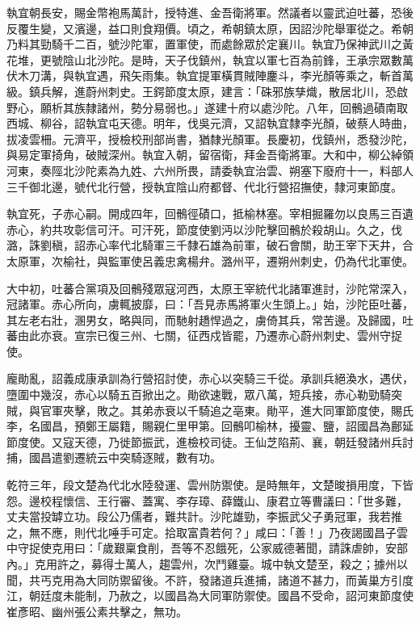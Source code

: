 \begin{pinyinscope}
 執宜朝長安，賜金幣袍馬萬計，授特進、金吾衛將軍。然議者以靈武迫吐蕃，恐後反覆生變，又濱邊，益口則食翔價。頃之，希朝鎮太原，因詔沙陀舉軍從之。希朝乃料其勁騎千二百，號沙陀軍，置軍使，而處餘眾於定襄川。執宜乃保神武川之黃花堆，更號陰山北沙陀。是時，天子伐鎮州，執宜以軍七百為前鋒，王承宗眾數萬伏木刀溝，與執宜遇，飛矢雨集。執宜提軍橫貫賊陣鏖斗，李光顏等乘之，斬首萬級。鎮兵解，進蔚州刺史。王鍔節度太原，建言：「硃邪族孳熾，散居北川，恐啟野心，願析其族隸諸州，勢分易弱也。」遂建十府以處沙陀。八年，回鶻過磧南取西城、柳谷，詔執宜屯天德。明年，伐吳元濟，又詔執宜隸李光顏，破蔡人時曲，拔凌雲柵。元濟平，授檢校刑部尚書，猶隸光顏軍。長慶初，伐鎮州，悉發沙陀，與易定軍掎角，破賊深州。執宜入朝，留宿衛，拜金吾衛將軍。大和中，柳公綽領河東，奏陘北沙陀素為九姓、六州所畏，請委執宜治雲、朔塞下廢府十一，料部人三千御北邊，號代北行營，授執宜陰山府都督、代北行營招撫使，隸河東節度。



 執宜死，子赤心嗣。開成四年，回鶻徑磧口，抵榆林塞。宰相掘羅勿以良馬三百遺赤心，約共攻彰信可汗。可汗死，節度使劉沔以沙陀擊回鶻於殺胡山。久之，伐潞，誅劉稹，詔赤心率代北騎軍三千隸石雄為前軍，破石會關，助王宰下天井，合太原軍，次榆社，與監軍使呂義忠禽楊弁。潞州平，遷朔州刺史，仍為代北軍使。



 大中初，吐蕃合黨項及回鶻殘眾寇河西，太原王宰統代北諸軍進討，沙陀常深入，冠諸軍。赤心所向，虜輒披靡，曰：「吾見赤馬將軍火生頭上。」始，沙陀臣吐蕃，其左老右壯，溷男女，略與同，而馳射趫悍過之，虜倚其兵，常苦邊。及歸國，吐蕃由此亦衰。宣宗已復三州、七關，征西戍皆罷，乃遷赤心蔚州刺史、雲州守捉使。



 龐勛亂，詔義成康承訓為行營招討使，赤心以突騎三千從。承訓兵絕渙水，遇伏，墮圍中幾沒，赤心以騎五百掀出之。勛欲速戰，眾八萬，短兵接，赤心勒勁騎突賊，與官軍夾擊，敗之。其弟赤衰以千騎追之亳東。勛平，進大同軍節度使，賜氏李，名國昌，預鄭王屬籍，賜親仁里甲第。回鶻叩榆林，擾靈、鹽，詔國昌為鄜延節度使。又寇天德，乃徙節振武，進檢校司徒。王仙芝陷荊、襄，朝廷發諸州兵討捕，國昌遣劉遷統云中突騎逐賊，數有功。



 乾符三年，段文楚為代北水陸發運、雲州防禦使。是時無年，文楚晙損用度，下皆怨。邊校程懷信、王行審、蓋寓、李存璋、薛鐵山、康君立等曹議曰：「世多難，丈夫當投罅立功。段公乃儒者，難共計。沙陀雄勁，李振武父子勇冠軍，我若推之，無不應，則代北唾手可定。拾取富貴若何？」咸曰：「善！」乃夜謁國昌子雲中守捉使克用曰：「歲艱稟食削，吾等不忍餓死，公家威德著聞，請誅虐帥，安部內。」克用許之，募得士萬人，趨雲州，次鬥雞臺。城中執文楚至，殺之；據州以聞，共丐克用為大同防禦留後。不許，發諸道兵進捕，諸道不甚力，而黃巢方引度江，朝廷度未能制，乃赦之，以國昌為大同軍防禦使。國昌不受命，詔河東節度使崔彥昭、幽州張公素共擊之，無功。




\end{pinyinscope}
